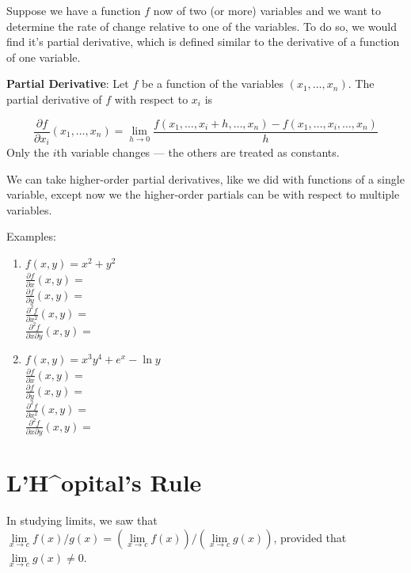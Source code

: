 \documentclass[]{book}
\theoremstyle{definition}
\theoremstyle{definition}
\theoremstyle{definition}
\theoremstyle{remark}
\begin{document}
Suppose we have a function \(f\) now of two (or more) variables and we
want to determine the rate of change relative to one of the variables.
To do so, we would find it's partial derivative, which is defined
similar to the derivative of a function of one variable.

\textbf{Partial Derivative}: Let \(f\) be a function of the variables
\((x_1,\ldots,x_n)\). The partial derivative of \(f\) with respect to
\(x_i\) is

\[\frac{\partial f}{\partial x_i} (x_1,\ldots,x_n) = \lim\limits_{h\to 0} \frac{f(x_1,\ldots,x_i+h,\ldots,x_n)-f(x_1,\ldots,x_i,\ldots,x_n)}{h}\]
Only the \(i\)th variable changes --- the others are treated as
constants.

We can take higher-order partial derivatives, like we did with functions
of a single variable, except now we the higher-order partials can be
with respect to multiple variables.

\begin{framed}
Examples:
\begin{enumerate}
        \item $f(x,y)=x^2+y^2$\\
            $\frac{\partial f}{\partial x}(x,y)=$\\
            $\frac{\partial f}{\partial y}(x,y)=$\\
            $\frac{\partial^2 f}{\partial x^2}(x,y)=$\\
            $\frac{\partial^2 f}{\partial x \partial y}(x,y)=$
        \item $f(x,y)=x^3 y^4 +e^x -\ln y$\\
            $\frac{\partial f}{\partial x}(x,y)=$\\
            $\frac{\partial f}{\partial y}(x,y)=$\\
            $\frac{\partial^2 f}{\partial x^2}(x,y)=$\\
            $\frac{\partial^2 f}{\partial x \partial y}(x,y)=$
    \end{enumerate}
\end{framed}

\section{L'H\^{}opital's Rule}\label{lhopitals-rule}

In studying limits, we saw that
\(\lim\limits_{x \to c} f(x)/g(x) = \left(\lim\limits_{x \to c} f(x)\right)/\left(\lim\limits_{x \to c} g(x)\right)\),
provided that \(\lim\limits_{x \to c} g(x)\ne 0\).
\end{document}
